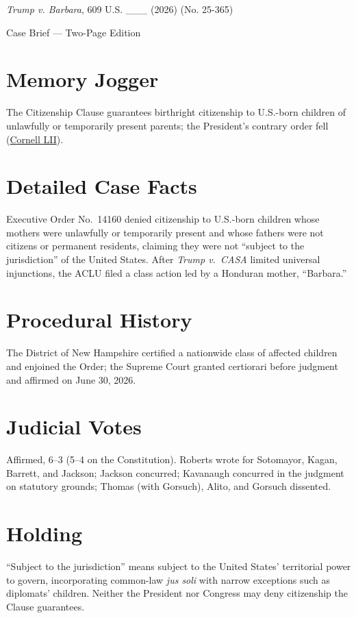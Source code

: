 \documentclass[12pt]{article}
\begin{document}
\begin{center}
{\LARGE \textit{Trump v. Barbara}, 609 U.S. \_\_\_ (2026) (No. 25-365)\par}
\vspace{0.5em}
{\large Case Brief --- Two-Page Edition\par}
\end{center}

\section{Memory Jogger}
The Citizenship Clause guarantees birthright citizenship to U.S.-born children of unlawfully or temporarily present parents; the President's contrary order fell (\href{https://www.law.cornell.edu/supremecourt/text/25-365}{Cornell LII}).

\section{Detailed Case Facts}
Executive Order No.~14160 denied citizenship to U.S.-born children whose mothers were unlawfully or temporarily present and whose fathers were not citizens or permanent residents, claiming they were not ``subject to the jurisdiction'' of the United States. After \textit{Trump v.\ CASA} limited universal injunctions, the ACLU filed a class action led by a Honduran mother, ``Barbara.''

\section{Procedural History}
The District of New Hampshire certified a nationwide class of affected children and enjoined the Order; the Supreme Court granted certiorari before judgment and affirmed on June 30, 2026.

\section{Judicial Votes}
Affirmed, 6--3 (5--4 on the Constitution). Roberts wrote for Sotomayor, Kagan, Barrett, and Jackson; Jackson concurred; Kavanaugh concurred in the judgment on statutory grounds; Thomas (with Gorsuch), Alito, and Gorsuch dissented.

\section{Holding}
``Subject to the jurisdiction'' means subject to the United States' territorial power to govern, incorporating common-law \textit{jus soli} with narrow exceptions such as diplomats' children. Neither the President nor Congress may deny citizenship the Clause guarantees.
\end{document}
